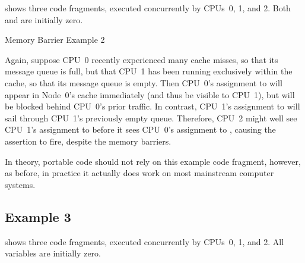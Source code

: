 shows three code fragments, executed concurrently by CPUs~0, 1, and 2.
Both  and  are initially zero.

\begin{listing}
\scriptsize
{}
\caption{Memory Barrier Example 2}
\label{lst:app:whymb:Memory Barrier Example 2}
\end{listing}

Again, suppose CPU~0 recently experienced many cache misses, so that its
message queue is full, but that CPU~1 has been running exclusively within
the cache, so that its message queue is empty.
Then CPU~0's assignment to  will appear in Node~0's cache
immediately (and thus be visible to CPU~1), but will be blocked behind
CPU~0's prior traffic.
In contrast, CPU~1's assignment to  will sail through CPU~1's
previously empty queue.
Therefore, CPU~2 might well see CPU~1's assignment to  before
it sees CPU~0's assignment to , causing the assertion to fire,
despite the memory barriers.

In theory, portable code should not rely on this example code fragment,
however, as before, in practice it actually does work on most
mainstream computer systems.

\subsection{Example 3}
\label{sec:app:whymb:Example 3}

shows three code fragments, executed concurrently by CPUs~0, 1, and 2.
All variables are initially zero.

